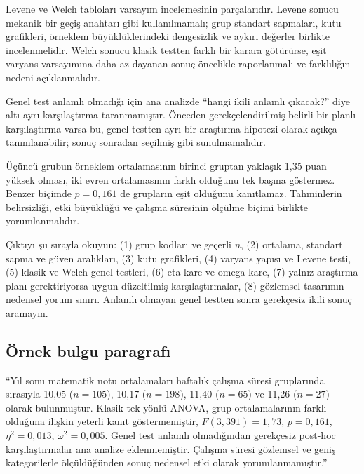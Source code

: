 Levene ve Welch tabloları varsayım incelemesinin parçalarıdır. Levene sonucu
mekanik bir geçiş anahtarı gibi kullanılmamalı; grup standart sapmaları, kutu
grafikleri, örneklem büyüklüklerindeki dengesizlik ve aykırı değerler birlikte
incelenmelidir. Welch sonucu klasik testten farklı bir karara götürürse,
eşit varyans varsayımına daha az dayanan sonuç öncelikle raporlanmalı ve
farklılığın nedeni açıklanmalıdır.

Genel test anlamlı olmadığı için ana analizde ``hangi ikili anlamlı çıkacak?''
diye altı ayrı karşılaştırma taranmamıştır. Önceden gerekçelendirilmiş belirli
bir planlı karşılaştırma varsa bu, genel testten ayrı bir araştırma hipotezi
olarak açıkça tanımlanabilir; sonuç sonradan seçilmiş gibi sunulmamalıdır.

\begin{mistakebox}
Üçüncü grubun örneklem ortalamasının birinci gruptan yaklaşık 1,35 puan yüksek
olması, iki evren ortalamasının farklı olduğunu tek başına göstermez. Benzer
biçimde $p=0{,}161$ de grupların eşit olduğunu kanıtlamaz. Tahminlerin
belirsizliği, etki büyüklüğü ve çalışma süresinin ölçülme biçimi birlikte
yorumlanmalıdır.
\end{mistakebox}

\begin{outputguidebox}
Çıktıyı şu sırayla okuyun: (1) grup kodları ve geçerli $n$, (2) ortalama,
standart sapma ve güven aralıkları, (3) kutu grafikleri, (4) varyans yapısı ve
Levene testi, (5) klasik ve Welch genel testleri, (6) eta-kare ve omega-kare,
(7) yalnız araştırma planı gerektiriyorsa uygun düzeltilmiş karşılaştırmalar,
(8) gözlemsel tasarımın nedensel yorum sınırı. Anlamlı olmayan genel testten
sonra gerekçesiz ikili sonuç aramayın.
\end{outputguidebox}

\subsection{Örnek bulgu paragrafı}

``Yıl sonu matematik notu ortalamaları haftalık çalışma süresi gruplarında
sırasıyla 10,05 ($n=105$), 10,17 ($n=198$), 11,40 ($n=65$) ve 11,26
($n=27$) olarak bulunmuştur. Klasik tek yönlü ANOVA, grup ortalamalarının
farklı olduğuna ilişkin yeterli kanıt göstermemiştir,
$F(3,391)=1{,}73$, $p=0{,}161$, $\eta^2=0{,}013$,
$\omega^2=0{,}005$. Genel test anlamlı olmadığından gerekçesiz post-hoc
karşılaştırmalar ana analize eklenmemiştir. Çalışma süresi gözlemsel ve geniş
kategorilerle ölçüldüğünden sonuç nedensel etki olarak yorumlanmamıştır.''

